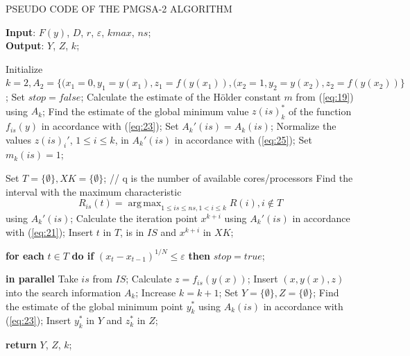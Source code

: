 \documentclass[review]{elsarticle}
\DeclareMathOperator*{\argmax}{arg\,max}
\begin{document}
\begin{algorithm}[]
\caption{PSEUDO CODE OF THE PMGSA-2 ALGORITHM} \label{alg:3}
\scriptsize
\hspace*{\algorithmicindent} \textbf{Input}: $F(y)$, $D$, $r$, $\varepsilon$, $kmax$, $ns$;\\
\hspace*{\algorithmicindent} \textbf{Output}: $Y$, $Z$, $k$;
\begin{algorithmic}[1]
\State Initialize $ k=2, A_2=\{(x_1=0,y_1=y(x_1),z_1=f(y(x_1)),(x_2=1,y_2=y(x_2),z_2=f(y(x_2))\} $;
\State Set $stop = false$;
	  \State Calculate the estimate of the H\"older constant $m$ from (\ref{eq:19}) using $A_k$;
		\State Find the estimate of the global minimum value $z(is)_k^*$ of the function $f_{is}(y)$ in accordance with (\ref{eq:23});
		\State Set $A_k'(is)=A_k (is)$;
		\State Normalize the values $z(is)_i'$, $1 \leq i \leq k$, in $A_k'(is)$ in accordance with (\ref{eq:25});
		\State Set $m_k (is)=1$;
	\EndFor
	
	\State Set $T = \{ \emptyset \}, XK = \{ \emptyset \}$;
	// q is the number of available cores/processors
	  \State Find the interval with the maximum characteristic 
		\begin{equation*}
			R_{is} (t)= \argmax_{1 \leq is \leq ns, 1 < i \leq k} R(i),i \notin T 
	  \end{equation*}
		using $A_k' (is)$;
		\State Calculate the iteration point $x^{k+i}$ using $A_k' (is)$ in accordance with (\ref{eq:21});
    \State Insert $t$ in $T$, is in $IS$ and $x^{k+i}$ in $XK$;

	\EndFor
  \State \textbf{for each} $t \in T$ \textbf{do if} $(x_t-x_{t-1} )^{1/N} \leq \varepsilon$ \textbf{then} $stop = true$;
	
	   \textbf{in parallel}
		  \State Take $is$ from $IS$;
	    \State Calculate $z = f_{is}(y(x))$;
      \State Insert $(x, y(x), z)$ into the search information $A_k$;
      \State Increase $k = k + 1$;
	  \EndFor
  \EndIf
	\EndWhile
	\State Set $Y = \{ \emptyset \}, Z = \{ \emptyset \}$;
	  \State Find the estimate of the global minimum point $y_k^*$ using $A_k (is)$ in accordance with (\ref{eq:23});
	  \State Insert $y_k^*$ in $Y$ and $z_k^*$ in $Z$;
	\EndFor

\State \textbf{return} $Y$, $Z$, $k$;
\end{algorithmic}
\end{algorithm}
\end{document}
